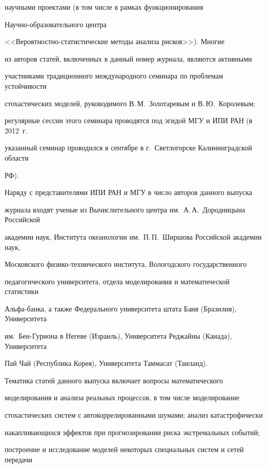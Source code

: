 {{{научными проектами (в том числе в рамках функционирования 

      На\-уч\-но-обра\-зо\-ва\-тель\-но\-го центра 

      <<Ве\-ро\-ят\-но\-ст\-но-ста\-ти\-сти\-че\-ские методы анализа рисков>>). Многие 

из авторов статей, включенных в данный номер журнала, являются активными 

участниками традиционного международного семинара по проблемам устойчивости 

стохастических моделей, руководимого В.\,М.~Золотаревым и В.\,Ю.~Королевым; 

регулярные сессии этого семинара проводятся под эгидой МГУ и ИПИ РАН (в 2012~г.\ 

указанный семинар проводился в сентябре в г.~Светлогорске Калининградской области 

РФ). 

      

      Наряду с представителями ИПИ РАН и МГУ в число авторов данного выпуска 

журнала входят ученые из Вычислительного центра им.\ А.\,А.~Дородницына Российской 

академии наук, Института океанологии им.\ П.\,П.~Ширшова Российской академии наук, 

Московского фи\-зи\-ко-тех\-ни\-че\-ско\-го института, Вологодского государственного 

педагогического университета, отдела моделирования и математической статистики 

Аль\-фа-бан\-ка, а также Федерального университета штата Баия (Бразилия), Университета 

им.\ Бен-Гу\-рио\-на в Негеве (Израиль), Университета Реджайны (Канада), Университета 

Пай Чай (Республика Корея), Университета Таммасат (Таиланд).

      

      Тематика статей данного выпуска включает вопросы математического 

моделирования и анализа реальных процессов, в том числе моделирование  

стохастических систем с автокоррелированными шумами; анализ катастрофически 

накапливающихся эффектов при прогнозировании риска экстремальных событий; 

построение и исследование моделей некоторых специальных систем и сетей передачи 

}}}
